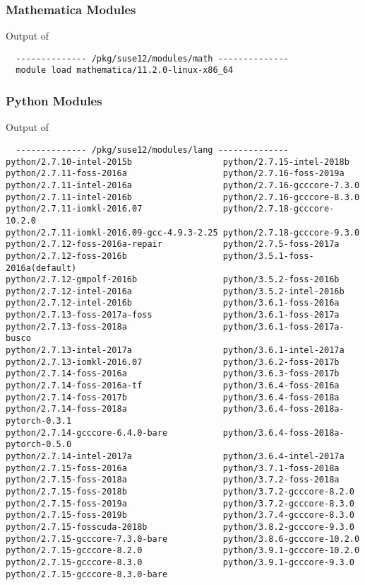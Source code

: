 \subsubsection{Mathematica Modules}
Output of 
  \begin{verbatim}
  -------------- /pkg/suse12/modules/math --------------
  module load mathematica/11.2.0-linux-x86_64
\end{verbatim}

\subsubsection{Python Modules}
Output of 
\begin{verbatim}
  -------------- /pkg/suse12/modules/lang --------------
python/2.7.10-intel-2015b                  python/2.7.15-intel-2018b
python/2.7.11-foss-2016a                   python/2.7.16-foss-2019a
python/2.7.11-intel-2016a                  python/2.7.16-gcccore-7.3.0
python/2.7.11-intel-2016b                  python/2.7.16-gcccore-8.3.0
python/2.7.11-iomkl-2016.07                python/2.7.18-gcccore-10.2.0
python/2.7.11-iomkl-2016.09-gcc-4.9.3-2.25 python/2.7.18-gcccore-9.3.0
python/2.7.12-foss-2016a-repair            python/2.7.5-foss-2017a
python/2.7.12-foss-2016b                   python/3.5.1-foss-2016a(default)
python/2.7.12-gmpolf-2016b                 python/3.5.2-foss-2016b
python/2.7.12-intel-2016a                  python/3.5.2-intel-2016b
python/2.7.12-intel-2016b                  python/3.6.1-foss-2016a
python/2.7.13-foss-2017a-foss              python/3.6.1-foss-2017a
python/2.7.13-foss-2018a                   python/3.6.1-foss-2017a-busco
python/2.7.13-intel-2017a                  python/3.6.1-intel-2017a
python/2.7.13-iomkl-2016.07                python/3.6.2-foss-2017b
python/2.7.14-foss-2016a                   python/3.6.3-foss-2017b
python/2.7.14-foss-2016a-tf                python/3.6.4-foss-2016a
python/2.7.14-foss-2017b                   python/3.6.4-foss-2018a
python/2.7.14-foss-2018a                   python/3.6.4-foss-2018a-pytorch-0.3.1
python/2.7.14-gcccore-6.4.0-bare           python/3.6.4-foss-2018a-pytorch-0.5.0
python/2.7.14-intel-2017a                  python/3.6.4-intel-2017a
python/2.7.15-foss-2016a                   python/3.7.1-foss-2018a
python/2.7.15-foss-2018a                   python/3.7.2-foss-2018a
python/2.7.15-foss-2018b                   python/3.7.2-gcccore-8.2.0
python/2.7.15-foss-2019a                   python/3.7.2-gcccore-8.3.0
python/2.7.15-foss-2019b                   python/3.7.4-gcccore-8.3.0
python/2.7.15-fosscuda-2018b               python/3.8.2-gcccore-9.3.0
python/2.7.15-gcccore-7.3.0-bare           python/3.8.6-gcccore-10.2.0
python/2.7.15-gcccore-8.2.0                python/3.9.1-gcccore-10.2.0
python/2.7.15-gcccore-8.3.0                python/3.9.1-gcccore-9.3.0
python/2.7.15-gcccore-8.3.0-bare
\end{verbatim}
